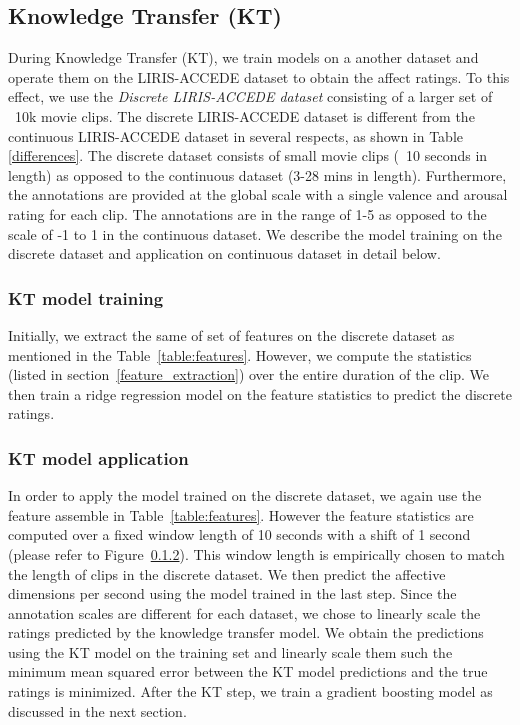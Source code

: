 \documentclass{article}
\begin{document}
\subsection{Knowledge Transfer (KT)}
During Knowledge Transfer (KT), we train models on a another dataset and operate them on the LIRIS-ACCEDE dataset to obtain the affect ratings.
To this effect, we use the {\it Discrete LIRIS-ACCEDE dataset} consisting of a larger set of ~10k movie clips.  
The discrete LIRIS-ACCEDE dataset is different from the continuous LIRIS-ACCEDE dataset in several respects, as shown in Table \ref{differences}.
The discrete dataset consists of small movie clips (~10 seconds in length) as opposed to the continuous dataset (3-28 mins in length).
Furthermore, the annotations are provided at the global scale with a single valence and arousal rating for each clip.
The annotations are in the range of 1-5 as opposed to the scale of -1 to 1 in the continuous dataset. 
We describe the model training on the discrete dataset and application on continuous dataset in detail below.

\subsubsection{KT model training}
Initially, we extract the same of set of features on the discrete dataset as mentioned in the Table~\ref{table:features}.
However, we compute the statistics (listed in section~\ref{feature_extraction}) over the entire duration of the clip.
We then train a ridge regression model on the feature statistics to predict the discrete ratings.

\subsubsection{KT model application}
In order to apply the model trained on the discrete dataset, we again use the feature assemble in Table~\ref{table:features}.
However the feature statistics are computed over a fixed window length of 10 seconds with a shift of 1 second (please refer to Figure~\ref{}). 
This window length is empirically chosen to match the length of clips in the discrete dataset.
We then predict the affective dimensions per second using the model trained in the last step.
Since the annotation scales are different for each dataset, we chose to linearly scale the ratings predicted by the knowledge transfer model.
We obtain the predictions using the KT model on the training set and linearly scale them such the minimum mean squared error between the KT model predictions and the true ratings is minimized. 
After the KT step, we train a gradient boosting model as discussed in the next section. 
\end{document}
